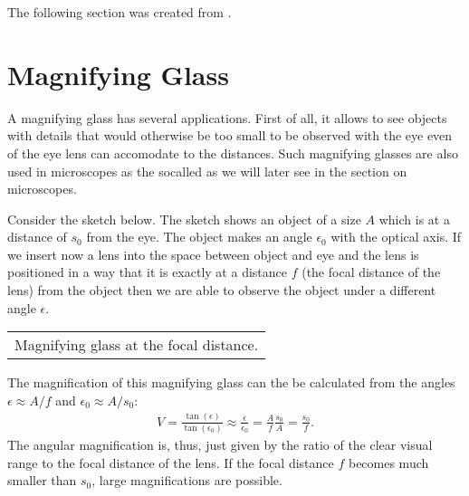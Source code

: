 \documentclass[letterpaper,10pt,english]{sphinxmanual}
\begin{document}
The following section was created from .


\section{Magnifying Glass}
\label{\detokenize{notebooks/L6/Magnifying Glass:Magnifying-Glass}}\label{\detokenize{notebooks/L6/Magnifying Glass::doc}}
A magnifying glass has several applications. First of all, it allows to see objects with details that would otherwise be too small to be observed with the eye even of the eye lens can accomodate to the distances. Such magnifying glasses are also used in microscopes as the so\sphinxhyphen{}called  as we will later see in the section on microscopes.

Consider the sketch below. The sketch shows an object of a size \(A\) which is at a distance of \(s_0\) from the eye. The object makes an angle \(\epsilon_0\) with the optical axis. If we insert now a lens into the space between object and eye and the lens is positioned in a way that it is exactly at a distance \(f\) (the focal distance of the lens) from the object then we are able to observe the object under a different angle \(\epsilon\).


\begin{savenotes}\sphinxattablestart
\centering
\begin{tabulary}{\linewidth}[t]{|T|}
\hline
\sphinxstyletheadfamily 
{}
\\
\hline
{} Magnifying glass at the focal distance.
\\
\hline
\end{tabulary}
\par
\sphinxattableend\end{savenotes}

The magnification of this magnifying glass can the be calculated from the angles \(\epsilon\approx A/f\) and \(\epsilon_0\approx A/s_0\):
\begin{equation*}
\begin{split}V=\frac{\tan(\epsilon)}{\tan(\epsilon_0)}\approx \frac{\epsilon}{\epsilon_0}=\frac{A}{f}\frac{s_0}{A}=\frac{s_0}{f}.\end{split}
\end{equation*}
The angular magnification is, thus, just given by the ratio of the clear visual range to the focal distance of the lens. If the focal distance \(f\) becomes much smaller than \(s_0\), large magnifications are possible.
\end{document}
